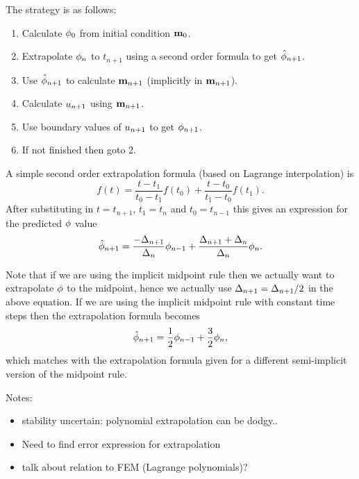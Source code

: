 The strategy is as follows:
\begin{enumerate}
\item Calculate $\phi_0$ from initial condition $\mathbf{m}_0$.
\item Extrapolate $\phi_n$ to $t_{n+1}$ using a second order formula to get $\hat{\phi}_{n+1}$.
\item Use $\hat{\phi}_{n+1}$ to calculate $\mathbf{m}_{n+1}$ (implicitly in $\mathbf{m}_{n+1}$).
\item Calculate $u_{n+1}$ using $\mathbf{m}_{n+1}$.
\item Use boundary values of $u_{n+1}$ to get $\phi_{n+1}$.
\item If not finished then goto 2.
\end{enumerate}

A simple second order extrapolation formula (based on Lagrange interpolation\cite[312]{Kincaid2002}) is 
\begin{equation}
  \label{eq:65}
  f(t) = \frac{t - t_1}{t_0 - t_1}f(t_0) + \frac{t - t_0}{t_1 - t_0}f(t_1).
\end{equation}
After substituting in $t=t_{n+1}$, $t_1=t_n$ and $t_0=t_{n-1}$ this gives an expression for the predicted $\phi$ value
\begin{equation}
  \label{eq:66}
  \hat{\phi}_{n+1} = \frac{-\Delta_{n+1}}{\Delta_{n}} \phi_{n-1} + \frac{\Delta_{n+1} + \Delta_{n}}{\Delta_{n}} \phi_n.
\end{equation}

Note that if we are using the implicit midpoint rule then we actually want to extrapolate $\phi$ to the midpoint, hence we actually use $\Delta_{n+1} = \Delta_{n+1} /2$ in the above equation.
If we are using the implicit midpoint rule with constant time steps then the extrapolation formula becomes
\begin{equation}
  \label{eq:67}
  \hat{\phi}_{n+1} = \frac{1}{2} \phi_{n-1} + \frac{3}{2} \phi_n,
\end{equation}
which matches with the extrapolation formula given for a different semi-implicit version of the midpoint rule\cite{Serpico2001}.

Notes:
\begin{itemize}
\item stability uncertain: polynomial extrapolation can be dodgy..
\item Need to find error expression for extrapolation
\item talk about relation to FEM (Lagrange polynomials)?
\end{itemize}

